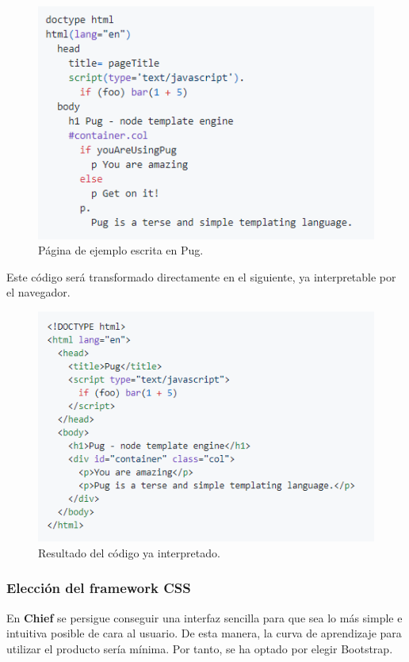 \begin{figure}[H]
	\centering
	\includegraphics[scale=0.85]{imagenes/pug-example.png}
	\caption{Página de ejemplo escrita en Pug. \label{fig:figura8}}
\end{figure}

Este código será transformado directamente en el siguiente, ya interpretable por el navegador.

\begin{figure}[H]
	\centering
	\includegraphics[scale=0.85]{imagenes/pug-rendered.png}
	\caption{Resultado del código ya interpretado. \label{fig:figura9}}
\end{figure}


\subsubsection{Elección del framework CSS}

En \textbf{Chief} se persigue conseguir una interfaz sencilla para que sea lo más simple e intuitiva posible de cara al usuario. De esta manera, la curva de aprendizaje
para utilizar el producto sería mínima. Por tanto, se ha optado por elegir Bootstrap.\\

